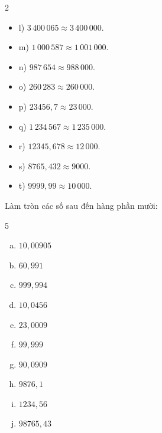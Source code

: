 \begin{bt}
{\begin{multicols}{2}
\begin{itemize}
			\item l) $3\,400\,065 \approx 3\,400\,000$.
			\item m) $1\,000\,587 \approx 1\,001\,000$.
			\item n) $987\,654 \approx 988\,000$.
			\item o) $260\,283 \approx 260\,000$.
			\item p) $23456{,}7 \approx 23\,000$.
			\item q) $1\,234\,567 \approx 1\,235\,000$.
			\item r) $12345{,}678 \approx 12\,000$.
			\item s) $8765{,}432 \approx 9000$.
			\item t) $9999{,}99 \approx 10\,000$.
		\end{itemize}
		\end{multicols}
	}
\end{bt}

\begin{bt}
	Làm tròn các số sau đến hàng phần mười:
	\begin{multicols}{5}
		\begin{enumerate}[a)]
			\item $10{,}00905$
			\item $60{,}991$
			\item $999{,}994$
			\item $10{,}0456$
			\item $23{,}0009$
			\item $99{,}999$
			\item $90{,}0909$
			\item $9876{,}1$
			\item $1234{,}56$
			\item $98765{,}43$
		\end{enumerate}
	\end{multicols}
\end{bt}

